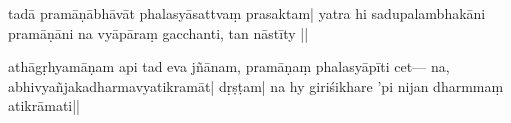 tadā pramāṇābhāvāt phalasyāsattvaṃ prasaktam| yatra hi sadupalambha\-kāni pramāṇāni na vyāpāraṃ gacchanti, tan nāstīty 
%
||

athāgṛhyamāṇam api tad eva jñā\mde nam, pra\mds māṇaṃ phalasyāpīti cet---%
na, a\mde bhivyañjakadharmavyatikramāt| 
dṛṣṭam| 
na hy  giriśikhare ’pi nijan dharmmaṃ atikrāmati||

